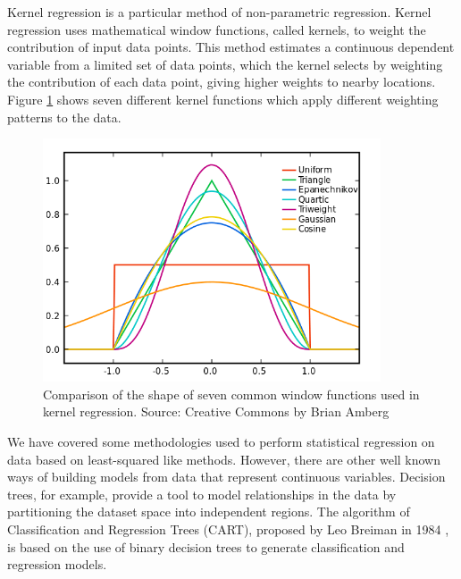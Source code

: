 \medskip

Kernel regression is a particular method of non-parametric regression. Kernel regression uses mathematical window functions, called kernels, to weight the contribution of input data points. This method estimates a continuous dependent variable from a limited set of data points, which the kernel selects by weighting the contribution of each data point, giving higher weights to nearby locations. Figure \ref{kernel_shapes} shows seven different kernel functions which apply different weighting patterns to the data.

\medskip

\begin{figure}[h]
 \centerline{\includegraphics[width=10cm]{kernel_shapes.png}} \caption{Comparison of the shape of seven common window functions used in kernel regression. Source: Creative Commons by Brian Amberg}\label{kernel_shapes}
\end{figure}

\bigskip
\bigskip


\bigskip
\bigskip

We have covered some methodologies used to perform statistical regression on data based on least-squared like methods. However, there are other well known ways of building models from data that represent continuous variables. Decision trees, for example, provide a tool to model relationships in the data by partitioning the dataset space into independent regions. The algorithm of Classification and Regression Trees (CART), proposed by Leo Breiman in 1984 \citep{breiman1984classification}, is based on the use of binary decision trees to generate classification and regression models. 

